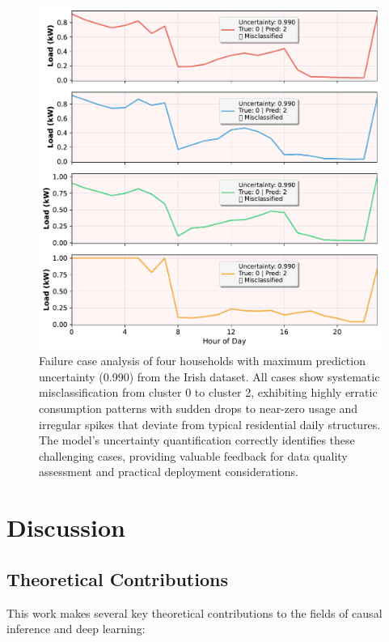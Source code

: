 \documentclass[journal]{IEEEtran}
\begin{document}
\begin{figure}[t!]
\centering
\includegraphics[width=1\columnwidth]{images/failure_case_analysis.pdf}
\caption{Failure case analysis of four households with maximum prediction uncertainty (0.990) from the Irish dataset. All cases show systematic misclassification from cluster 0 to cluster 2, exhibiting highly erratic consumption patterns with sudden drops to near-zero usage and irregular spikes that deviate from typical residential daily structures. The model's uncertainty quantification correctly identifies these challenging cases, providing valuable feedback for data quality assessment and practical deployment considerations.}
\label{fig:failure_case}
\end{figure}



\section{Discussion}

\subsection{Theoretical Contributions}
This work makes several key theoretical contributions to the fields of causal inference and deep learning:
\end{document}
